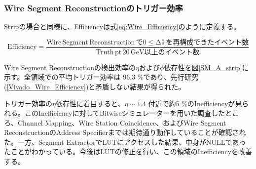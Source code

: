 \subsubsection{Wire Segment Reconstructionのトリガー効率}
\par
Stripの場合と同様に、Efficiencyは式\ref{eq:Wire_Efficiency}のように定義する。

\begin{equation}
    \mathrm {Efficiency} = \frac{\mathrm{Wire\,Segment \,Reconstruction\,で0\leq\Delta\theta\,を再構成できたイベント数}}{\mathrm{Truth\,pt \,20 \,GeV以上のイベント数}}
    \label{eq:Wire_Efficiency}
\end{equation}


Wire Segment Reconstructionの検出効率の$\eta$および$\phi$依存性を図\ref{SM_A_strip}に示す。全領域での平均トリガー効率は 96.3 \%であり、先行研究(\ref{Vivado_Wire_Efficiency})と矛盾しない結果が得られた。

トリガー効率の$\eta$依存性に着目すると、$\eta \sim 1.4$ 付近で約5 \%のInefficiencyが見られる。このInefficiencyに対してBitwiseシミュレーターを用いた調査したところ、Channel Mapping、Wire Station Coincidence、およびWire Segment ReconstructionのAddress Specifierまでは期待通り動作していることが確認された。一方、Segment ExtractorでLUTにアクセスした結果、中身がNULLであったことがわかっている。今後はLUTの修正を行い、この領域のInefficiencyを改善する。

